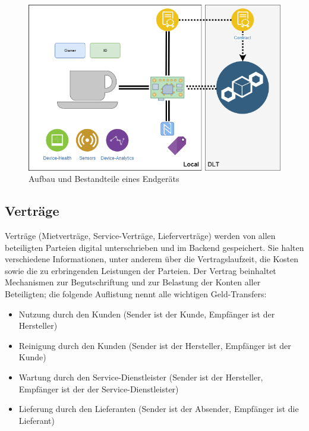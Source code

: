 \begin{figure}[htbp]
 \centering
 \includegraphics[width=1.0\textwidth]{gfx/IOT-Anwendungsfall_Device.png}
 \caption{Aufbau und Bestandteile eines Endgeräts}
 \label{fig:chapter04:usecase_device}
\end{figure}

\subsection{Verträge}
\label{subsec:iot_usecase:solution:contracts}
Verträge (Mietverträge, Service-Verträge, Lieferverträge) werden von allen beteiligten Parteien digital unterschrieben und im Backend gespeichert. Sie halten verschiedene Informationen, unter anderem über die Vertragslaufzeit, die Kosten sowie die zu erbringenden Leistungen der Parteien. Der Vertrag beinhaltet Mechanismen zur Begutschriftung und zur Belastung der Konten aller Beteiligten; die folgende Auflistung nennt alle wichtigen Geld-Transfers:
\begin{itemize}
  \item Nutzung durch den Kunden (Sender ist der Kunde, Empfänger ist der Hersteller)
  \item Reinigung durch den Kunden (Sender ist der Hersteller, Empfänger ist der Kunde)
  \item Wartung durch den Service-Dienstleister (Sender ist der Hersteller, Empfänger ist der der Service-Dienstleister)
  \item Lieferung durch den Lieferanten (Sender ist der Absender, Empfänger ist die Lieferant)
\end{itemize}

